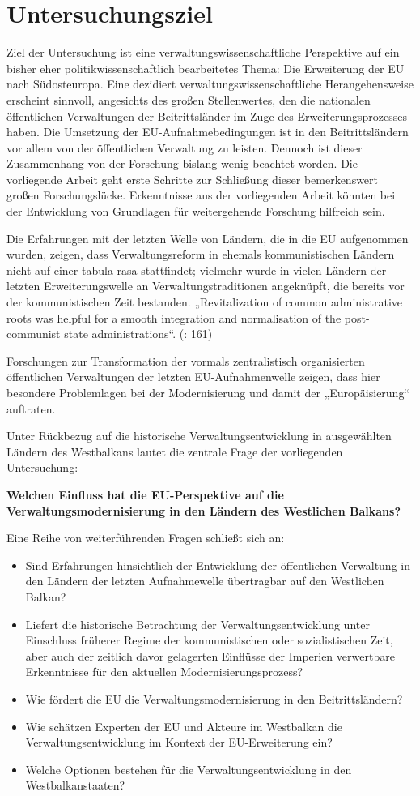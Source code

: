 \section{Untersuchungsziel}
Ziel der Untersuchung ist eine verwaltungswissenschaftliche Perspektive auf ein bisher eher politikwissenschaftlich bearbeitetes Thema: Die Erweiterung der EU nach Südosteuropa. Eine dezidiert verwaltungswissenschaftliche Herangehensweise erscheint sinnvoll, angesichts des großen Stellenwertes, den die nationalen öffentlichen Verwaltungen der Beitrittsländer im Zuge des Erweiterungsprozesses haben. Die Umsetzung der EU-Aufnahmebedingungen ist in den Beitrittsländern vor allem von der öffentlichen Verwaltung zu leisten. Dennoch ist dieser Zusammenhang von der Forschung bislang wenig beachtet worden. Die vorliegende Arbeit geht erste Schritte zur Schließung dieser bemerkenswert großen Forschungslücke. Erkenntnisse aus der vorliegenden Arbeit könnten bei der Entwicklung von Grundlagen für weitergehende Forschung hilfreich sein.\par
Die Erfahrungen mit der letzten Welle von Ländern, die in die EU aufgenommen wurden, zeigen, dass Verwaltungsreform in ehemals kommunistischen Ländern nicht auf einer tabula rasa stattfindet; vielmehr wurde in vielen Ländern der letzten Erweiterungswelle an Verwaltungstraditionen angeknüpft, die bereits vor der kommunistischen Zeit bestanden. „Revitalization of common administrative roots was helpful for a smooth integration and normalisation of the post-communist state administrations“. (\cite{lipumb05}: 161) \par
Forschungen zur Transformation der vormals zentralistisch organisierten öffentlichen Verwaltungen der letzten EU-Aufnahmenwelle zeigen, dass hier besondere Problemlagen bei der Modernisierung und damit der „Europäisierung“ auftraten.\par
Unter Rückbezug auf die historische Verwaltungsentwicklung in ausgewählten Ländern des Westbalkans lautet die zentrale Frage der vorliegenden Untersuchung:\par
{\bf Welchen Einfluss hat die EU-Perspektive auf die Verwaltungsmodernisierung in den Ländern des Westlichen Balkans?}

Eine Reihe von weiterführenden Fragen schließt sich an:
\begin{itemize}
\item Sind Erfahrungen hinsichtlich der Entwicklung der öffentlichen Verwaltung in den Ländern der letzten Aufnahmewelle übertragbar auf den Westlichen Balkan?
\item  Liefert die historische Betrachtung der Verwaltungsentwicklung unter Einschluss früherer Regime der kommunistischen oder sozialistischen Zeit, aber auch der zeitlich davor gelagerten Einflüsse der Imperien verwertbare Erkenntnisse für den aktuellen Modernisierungsprozess?
\item Wie fördert die EU die Verwaltungsmodernisierung in den Beitrittsländern?
\item Wie schätzen Experten der EU und Akteure im Westbalkan die Verwaltungsentwicklung im Kontext der EU-Erweiterung ein?
\item Welche Optionen bestehen für die Verwaltungsentwicklung in den Westbalkanstaaten?
\end{itemize}
